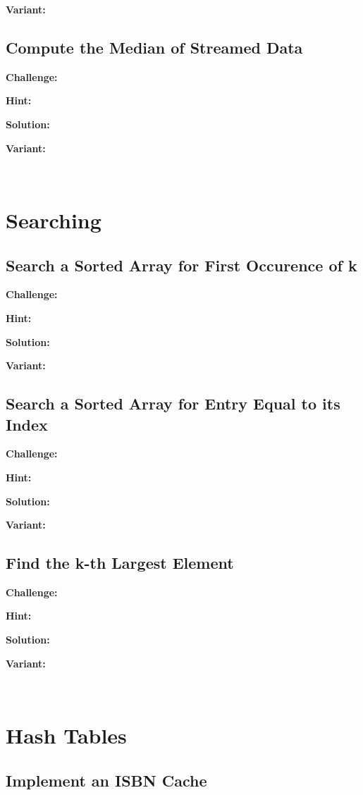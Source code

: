 \documentclass[11pt,a4paper]{article}
\begin{document}
\textbf{Variant:} 

\subsection{Compute the Median of Streamed Data}

\textbf{Challenge:} 

\textbf{Hint:} 

\textbf{Solution:} 

\textbf{Variant:} 

\ %

\section{Searching}

\subsection{Search a Sorted Array for First Occurence of k}

\textbf{Challenge:} 

\textbf{Hint:} 

\textbf{Solution:} 

\textbf{Variant:} 

\subsection{Search a Sorted Array for Entry Equal to its Index}

\textbf{Challenge:} 

\textbf{Hint:} 

\textbf{Solution:} 

\textbf{Variant:} 

\subsection{Find the k-th Largest Element}

\textbf{Challenge:} 

\textbf{Hint:} 

\textbf{Solution:} 

\textbf{Variant:} 

\ %

\section{Hash Tables}

\subsection{Implement an ISBN Cache}
\end{document}
